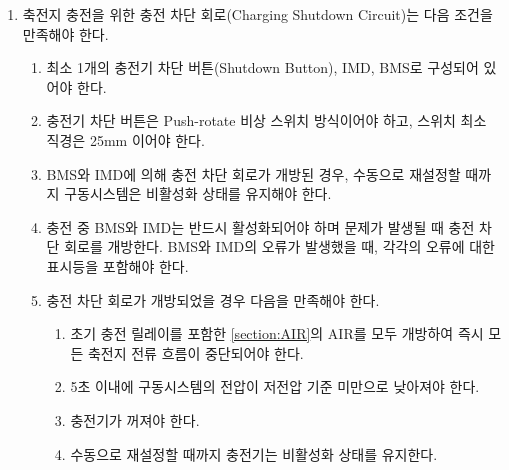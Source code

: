 \documentclass[final,a4paper,10pt]{report}
\begin{document}
\begin{enumerate}
  \item\label{rule:formula-technical.ts-maintenance-charging.charging-sdc} 축전지 충전을 위한 충전 차단 회로(Charging Shutdown Circuit)는 다음 조건을 만족해야 한다. \label{item:충전 차단 회로}
    \begin{enumerate}
      \item\label{rule:formula-technical.ts-maintenance-charging.charging-sdc.button-imd-bms-composition} 최소 1개의 충전기 차단 버튼(Shutdown Button), IMD, BMS로 구성되어 있어야 한다.
      \item\label{rule:formula-technical.ts-maintenance-charging.charging-sdc.push-rotate-min-25mm} 충전기 차단 버튼은 Push-rotate 비상 스위치 방식이어야 하고, 스위치 최소 직경은 25mm 이어야 한다.
      \item\label{rule:formula-technical.ts-maintenance-charging.charging-sdc.latched-until-manual-reset} BMS와 IMD에 의해 충전 차단 회로가 개방된 경우, 수동으로 재설정할 때까지 구동시스템은 비활성화 상태를 유지해야 한다.
      \item\label{rule:formula-technical.ts-maintenance-charging.charging-sdc.bms-imd-fault-indicators} 충전 중 BMS와 IMD는 반드시 활성화되어야 하며 문제가 발생될 때 충전 차단 회로를 개방한다. BMS와 IMD의 오류가 발생했을 때, 각각의 오류에 대한 표시등을 포함해야 한다.

      \item\label{rule:formula-technical.ts-maintenance-charging.charging-sdc.trip-sequence} 충전 차단 회로가 개방되었을 경우 다음을 만족해야 한다.
        \begin{enumerate}
          \item\label{rule:formula-technical.ts-maintenance-charging.charging-sdc.trip-sequence.all-airs-open-immediately} {\color{blue}초기 충전 릴레이를 포함한 \ref{section:AIR}의 AIR를 모두 개방하여} 즉시 모든 축전지 전류 흐름이 중단되어야 한다.
          \item\label{rule:formula-technical.ts-maintenance-charging.charging-sdc.trip-sequence.discharge-within-5s} 5초 이내에 구동시스템의 전압이 저전압 기준 미만으로 낮아져야 한다.
          \item\label{rule:formula-technical.ts-maintenance-charging.charging-sdc.trip-sequence.charger-off} 충전기가 꺼져야 한다.
          \item\label{rule:formula-technical.ts-maintenance-charging.charging-sdc.trip-sequence.charger-latched-until-reset} 수동으로 재설정할 때까지 충전기는 비활성화 상태를 유지한다.
        \end{enumerate}


\end{enumerate}
\end{enumerate}
\end{document}
